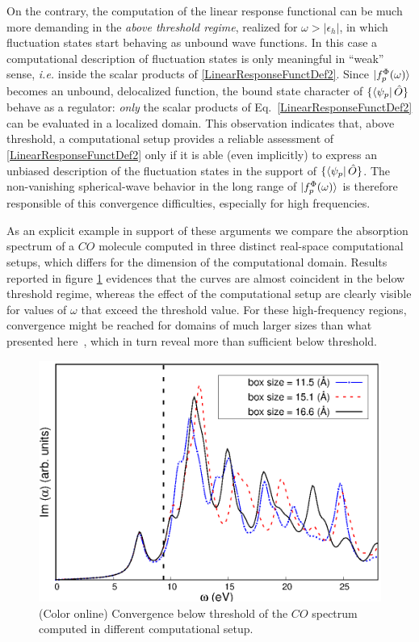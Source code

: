 \documentclass[reprint,aps,prb]{revtex4-1}
\newcommand{\eps}{\epsilon}
\newcommand{\op}[1]{\hat {#1}}
\begin{document}
On the contrary, the computation of the linear response functional can be much more demanding in the \emph{above threshold regime}, realized for $\omega>|\eps_h|$, in which fluctuation 
states start behaving as unbound wave functions. In this case a computational description of fluctuation states is only meaningful in ``weak'' sense,
\emph{i.e.} inside the scalar products of 
\eqref{LinearResponseFunctDef2}. 
Since $\ket{f_p^\Phi(\omega)}$ becomes an unbound, delocalized function, the bound state character of $\{\bra{\psi_p}\op O\}$ behave as a regulator:
\emph{only} the scalar products of Eq.~\eqref{LinearResponseFunctDef2} can be evaluated in a localized domain.
This observation indicates that, above threshold, a computational setup 
provides a reliable assessment of \eqref{LinearResponseFunctDef2} only if it is able (even implicitly) to express an
unbiased description of the fluctuation states in the support of $\{\bra{\psi_p}\op O\}$.
The non-vanishing spherical-wave behavior in the long range of $\ket{f_p^\Phi(\omega)}$ is therefore responsible
of this convergence difficulties, especially for high frequencies.

As an explicit example in support of these arguments we compare the absorption spectrum of a $CO$ molecule computed in 
three distinct real-space computational setups, which differs for the dimension of 
the computational domain. Results reported in figure \ref{co_spectrum} evidences that the curves are almost coincident in the below threshold regime,
whereas the effect of the computational setup are clearly visible for values of $\omega$ that exceed the threshold value.
For these high-frequency regions, convergence might be reached for domains of much larger sizes than what presented here~\cite{baroni2008},
which in turn reveal more than sufficient below threshold.

\begin{figure}
\includegraphics[scale=0.6]{CO_spectrum.eps}
\caption{\label{co_spectrum}(Color online) Convergence below threshold of the $CO$ spectrum computed in different computational setup.}
\end{figure}
\end{document}
